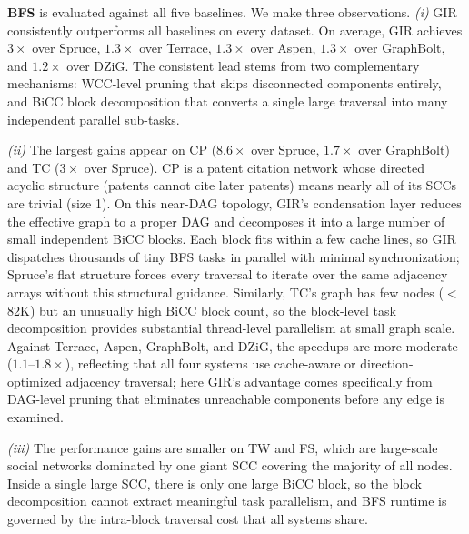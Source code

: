 \textbf{BFS} is evaluated against all five baselines.
We make three observations.
\textit{(i)} GIR consistently outperforms all baselines on every dataset.
On average, GIR achieves $3\times$ over Spruce, $1.3\times$ over Terrace, $1.3\times$ over Aspen, $1.3\times$ over GraphBolt, and $1.2\times$ over DZiG.
The consistent lead stems from two complementary mechanisms: WCC-level pruning that skips disconnected components entirely, and BiCC block decomposition that converts a single large traversal into many independent parallel sub-tasks.

\textit{(ii)} The largest gains appear on CP ($8.6\times$ over Spruce, $1.7\times$ over GraphBolt) and TC ($3\times$ over Spruce).
CP is a patent citation network whose directed acyclic structure (patents cannot cite later patents) means nearly all of its SCCs are trivial (size 1).
On this near-DAG topology, GIR's condensation layer reduces the effective graph to a proper DAG and decomposes it into a large number of small independent BiCC blocks.
Each block fits within a few cache lines, so GIR dispatches thousands of tiny BFS tasks in parallel with minimal synchronization; Spruce's flat structure forces every traversal to iterate over the same adjacency arrays without this structural guidance.
Similarly, TC's graph has few nodes ($<$82K) but an unusually high BiCC block count, so the block-level task decomposition provides substantial thread-level parallelism at small graph scale.
Against Terrace, Aspen, GraphBolt, and DZiG, the speedups are more moderate ($1.1$--$1.8\times$), reflecting that all four systems use cache-aware or direction-optimized adjacency traversal; here GIR's advantage comes specifically from DAG-level pruning that eliminates unreachable components before any edge is examined.

\textit{(iii)} The performance gains are smaller on TW and FS, which are large-scale social networks dominated by one giant SCC covering the majority of all nodes.
Inside a single large SCC, there is only one large BiCC block, so the block decomposition cannot extract meaningful task parallelism, and BFS runtime is governed by the intra-block traversal cost that all systems share.

